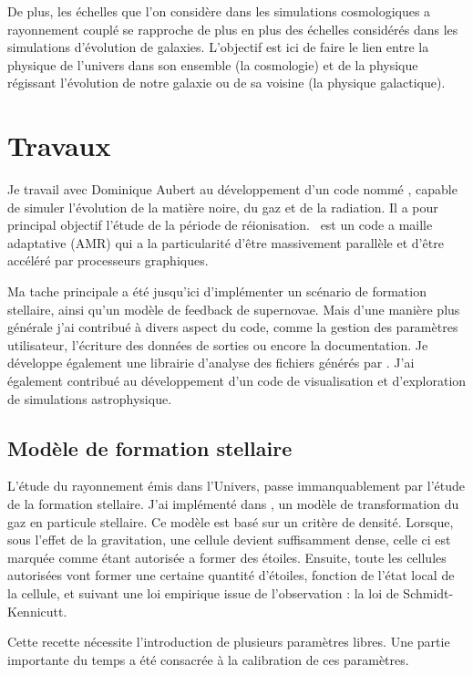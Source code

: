 De plus, les échelles que l'on considère dans les simulations cosmologiques a rayonnement couplé se rapproche de plus en plus des échelles considérés dans les simulations d'évolution de galaxies.
L'objectif est ici de faire le lien entre la physique de l'univers dans son ensemble (la cosmologie) et de la physique régissant l'évolution de notre galaxie ou de sa voisine (la physique galactique).




\section{Travaux}

Je travail avec Dominique Aubert au développement d'un code nommé \emma, capable de simuler l'évolution de la matière noire, du gaz et de la radiation.
Il a pour principal objectif l'étude de la période de réionisation.
\emma\ est un code a maille adaptative (AMR) qui a la particularité d'être massivement parallèle et d'être accéléré par processeurs graphiques.

Ma tache principale a été jusqu'ici d'implémenter un scénario de formation stellaire, ainsi qu'un modèle de feedback de supernovae.
Mais d'une manière plus générale j'ai contribué à divers aspect du code, comme la gestion des paramètres utilisateur, l'écriture des données de sorties ou encore la documentation.
Je développe également une librairie d'analyse des fichiers générés par \emma.
J'ai également contribué au développement d'un code de visualisation et d'exploration de simulations astrophysique.

\subsection*{Mod\`ele de formation stellaire}
L'étude du rayonnement émis dans l'Univers, passe immanquablement par l'étude de la formation stellaire.
J'ai implémenté dans \emma, un modèle de transformation du gaz en particule stellaire.
Ce modèle est basé sur un critère de densité.
Lorsque, sous l'effet de la gravitation, une cellule devient suffisamment dense, celle ci est marquée comme étant autorisée a former des étoiles.
Ensuite, toute les cellules autorisées vont former une certaine quantité d'étoiles, fonction de l'état local de la cellule, et suivant une loi empirique issue de l'observation : la loi de Schmidt-Kennicutt.

Cette recette nécessite l'introduction de plusieurs paramètres libres.
Une partie importante du temps a été consacrée à la calibration de ces paramètres.

